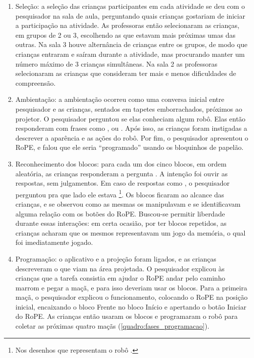 \begin{enumerate}
    \item Seleção: a seleção das crianças participantes em cada atividade se deu com o pesquisador na sala de aula, perguntando quais crianças gostariam de iniciar a participação na atividade. As professoras então selecionaram as crianças, em grupos de 2 ou 3, escolhendo as que estavam mais próximas umas das outras. Na sala 3 houve alternância de crianças entre os grupos, de modo que crianças entraram e saíram durante a atividade, mas procurando manter um número máximo de 3 crianças simultâneas. Na sala 2 as professoras selecionaram as crianças que consideram ter mais e menos dificuldades de compreensão.
    
    \item Ambientação: a ambientação ocorreu como uma conversa inicial entre pesquisador e as crianças, sentados em tapetes emborrachados, próximos ao projetor. O pesquisador perguntou se elas conheciam algum robô. Elas então responderam com frases como , ou . Após isso, as crianças foram instigadas a descrever a aparência e as ações do robô. Por fim, o pesquisador apresentou o RoPE, e falou que ele seria “programado” usando os bloquinhos de papelão.
    
    \item Reconhecimento dos blocos: para cada um dos cinco blocos, em ordem aleatória, as crianças responderam a pergunta . A intenção foi ouvir as respostas, sem julgamentos. Em caso de respostas como , o pesquisador perguntou pra que lado ele estava \footnote{Nos desenhos que representam o robô .}. Os blocos ficaram ao alcance das crianças, e se observou como as mesmas os manipulavam e se identificavam alguma relação com os botões do RoPE. Buscou-se permitir liberdade durante essas interações: em certa ocasião, por ter blocos repetidos, as crianças acharam que os mesmos representavam um jogo da memória, o qual foi imediatamente jogado.
    
    \item Programação: o aplicativo e a projeção foram ligados, e as crianças descreveram o que viam na área projetada. O pesquisador explicou às crianças que a tarefa consistia em ajudar o RoPE andar pelo caminho marrom e pegar a maçã, e para isso deveriam usar os blocos. Para a primeira maçã, o pesquisador explicou o funcionamento, colocando o RoPE na posição inicial, encaixando o bloco Frente no bloco Início e apertando o botão Iniciar do RoPE. As crianças então usaram os blocos e programaram o robô para coletar as próximas quatro maçãs (\autoref{quadro:fases_programacao}).
    

\end{enumerate}
